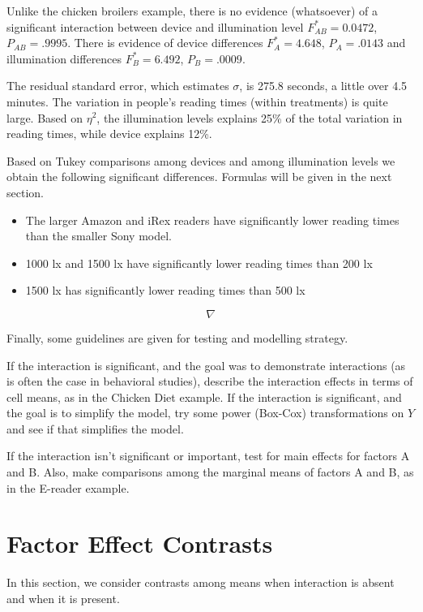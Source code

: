 \documentclass[
]{book}
\providecommand{\tightlist}{%
  \setlength{\itemsep}{0pt}\setlength{\parskip}{0pt}}
\begin{document}
Unlike the chicken broilers example, there is no evidence (whatsoever)
of a significant interaction between device and illumination level
\(F_{AB}^*=0.0472\), \(P_{AB}=.9995\). There is evidence of device
differences \(F_A^*=4.648\), \(P_A=.0143\) and illumination differences
\(F_B^*=6.492\), \(P_B=.0009\).

The residual standard error, which estimates \(\sigma\), is 275.8
seconds, a little over 4.5 minutes. The variation in people's reading
times (within treatments) is quite large. Based on \(\eta^2\), the
illumination levels explains 25\% of the total variation in reading
times, while device explains 12\%.

Based on Tukey comparisons among devices and among illumination levels
we obtain the following significant differences. Formulas will be given
in the next section.

\begin{itemize}
\tightlist
\item
  The larger Amazon and iRex readers have significantly lower reading
  times than the smaller Sony model.
\item
  1000 lx and 1500 lx have significantly lower reading times than 200 lx
\item
  1500 lx has significantly lower reading times than 500 lx
\end{itemize}

\[ \nabla \]

Finally, some guidelines are given for testing and modelling strategy.

If the interaction is significant, and the goal was to demonstrate
interactions (as is often the case in behavioral studies), describe the
interaction effects in terms of cell means, as in the Chicken Diet
example. If the interaction is significant, and the goal is to simplify
the model, try some power (Box-Cox) transformations on \(Y\) and see if
that simplifies the model.

If the interaction isn't significant or important, test for main effects
for factors A and B. Also, make comparisons among the marginal means of
factors A and B, as in the E-reader example.

\section{Factor Effect Contrasts}\label{factor-effect-contrasts}

In this section, we consider contrasts among means when interaction is
absent and when it is present.
\end{document}

